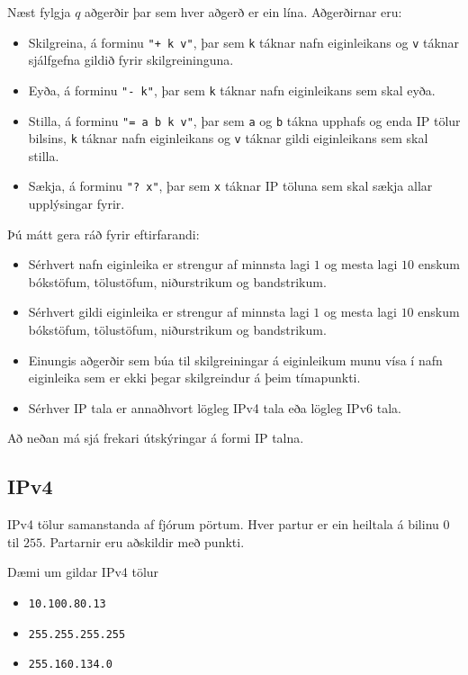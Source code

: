 Næst fylgja $q$ aðgerðir þar sem hver aðgerð er ein lína.
Aðgerðirnar eru:
\begin{itemize}
    \item Skilgreina, á forminu \texttt{"+ k v"},
        þar sem \texttt{k} táknar nafn eiginleikans og \texttt{v} táknar sjálfgefna gildið fyrir skilgreininguna.
    \item Eyða, á forminu \texttt{"- k"}, þar sem \texttt{k} táknar nafn eiginleikans sem skal eyða.
    \item Stilla, á forminu \texttt{"= a b k v"}, þar sem \texttt{a} og \texttt{b} tákna upphafs og enda IP tölur bilsins, \texttt{k} táknar nafn eiginleikans og \texttt{v} táknar gildi eiginleikans sem skal stilla.
    \item Sækja, á forminu \texttt{"? x"}, þar sem \texttt{x} táknar IP töluna sem skal sækja allar upplýsingar fyrir.
\end{itemize}

Þú mátt gera ráð fyrir eftirfarandi:
\begin{itemize}
    \item Sérhvert nafn eiginleika er strengur af minnsta lagi $1$ og mesta lagi $10$ enskum bókstöfum, tölustöfum, niðurstrikum og bandstrikum.
    \item Sérhvert gildi eiginleika er strengur af minnsta lagi $1$ og mesta lagi $10$ enskum bókstöfum, tölustöfum, niðurstrikum og bandstrikum.
    \item Einungis aðgerðir sem búa til skilgreiningar á eiginleikum munu vísa í nafn eiginleika sem er ekki þegar skilgreindur á þeim tímapunkti.
    \item Sérhver IP tala er annaðhvort lögleg IPv4 tala eða lögleg IPv6 tala.
\end{itemize}

Að neðan má sjá frekari útskýringar á formi IP talna.

\subsection*{IPv4}
IPv4 tölur samanstanda af fjórum pörtum.
Hver partur er ein heiltala á bilinu $0$ til $255$.
Partarnir eru aðskildir með punkti.

Dæmi um gildar IPv4 tölur
\begin{itemize}
	\item \texttt{10.100.80.13}
	\item \texttt{255.255.255.255}
	\item \texttt{255.160.134.0}
\end{itemize}

